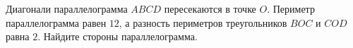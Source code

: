 \begin{ex}
	\begin{condition}
		Диагонали параллелограмма \( ABCD  \) пересекаются в точке \( O \). Периметр параллелограмма равен \( 12 \), а разность периметров треугольников \( BOC  \) и \( COD  \) равна \( 2  \). Найдите стороны параллелограмма.
	\end{condition}
\end{ex}